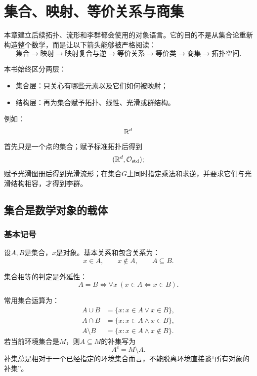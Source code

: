 \chapter{集合、映射、等价关系与商集}
\label{chap:md-02}


本章建立后续拓扑、流形和李群都会使用的对象语言。它的目的不是从集合论重新构造整个数学，而是让以下箭头能够被严格阅读：
\[
    \text{集合}
    \longrightarrow
    \text{映射}
    \longrightarrow
    \text{映射复合与逆}
    \longrightarrow
    \text{等价关系}
    \longrightarrow
    \text{等价类}
    \longrightarrow
    \text{商集}
    \longrightarrow
    \text{拓扑空间}.
\]

本书始终区分两层：

\begin{itemize}
    \item 集合层：只关心有哪些元素以及它们如何被映射；
    \item 结构层：再为集合赋予拓扑、线性、光滑或群结构。
\end{itemize}

例如：
\[
    \mathbb{R}^d
\]
首先只是一个点的集合；赋予标准拓扑后得到
\[
    (\mathbb{R}^d,\mathcal O_{\mathrm{std}});
\]
赋予光滑图册后得到光滑流形；在集合$G$上同时指定乘法和求逆，并要求它们与光滑结构相容，才得到李群。


\section{集合是数学对象的载体}

\subsection{基本记号}

设$A,B$是集合，$x$是对象。基本关系和包含关系为：
\[
    x\in A,\qquad x\notin A,\qquad A\subseteq B.
\]

集合相等的判定是外延性：
\[
    A=B
    \Longleftrightarrow
    \forall x\ (x\in A\Longleftrightarrow x\in B).
\]

常用集合运算为：
\[
\begin{aligned}
    A\cup B&=\{x:x\in A\lor x\in B\},\\
    A\cap B&=\{x:x\in A\land x\in B\},\\
    A\setminus B&=\{x:x\in A\land x\notin B\}.
\end{aligned}
\]
若当前环境集合是$M$，则$A\subseteq M$的补集写为
\[
    A^c=M\setminus A.
\]
补集总是相对于一个已经指定的环境集合而言，不能脱离环境直接谈“所有对象的补集”。


